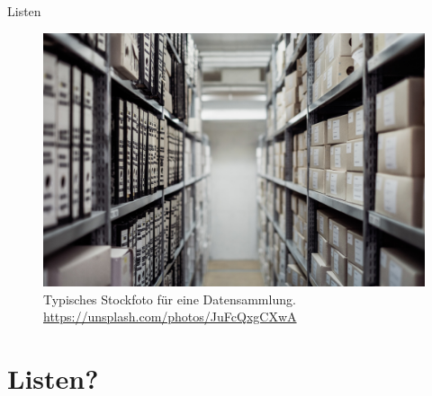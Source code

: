 



\begin{titleframe}
	\begin{center}
		{\huge Listen}
		\vspace{0.33cm}
		\begin{figure}
			\includegraphics[height=0.7\textheight]{media/cern.jpg}
			\\	\sffamily \tiny Typisches Stockfoto für eine Datensammlung.\\ \href{https://unsplash.com/photos/JuFcQxgCXwA}{https://unsplash.com/photos/JuFcQxgCXwA}
		\end{figure}
	\end{center}
\end{titleframe}

\tocslide

\section{Listen?}
\begin{frame}
	\slidehead
\end{frame}

